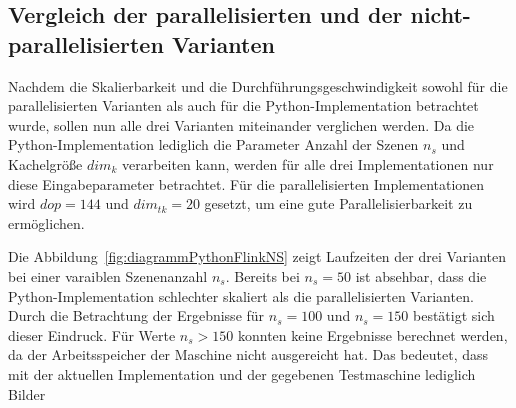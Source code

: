 \subsection{Vergleich der parallelisierten und der nicht-parallelisierten Varianten}
Nachdem die Skalierbarkeit und die Durchführungsgeschwindigkeit sowohl für die parallelisierten Varianten als auch für die Python-Implementation betrachtet wurde, sollen nun alle drei Varianten miteinander verglichen werden. Da die Python-Implementation lediglich die Parameter Anzahl der Szenen $n_s$ und Kachelgröße $dim_k$ verarbeiten kann, werden für alle drei Implementationen nur diese Eingabeparameter betrachtet. Für die parallelisierten Implementationen wird $dop=144$ und $dim_{tk} = 20$ gesetzt, um eine gute Parallelisierbarkeit zu ermöglichen.

Die Abbildung~\ref{fig:diagrammPythonFlinkNS} zeigt Laufzeiten der drei Varianten bei einer varaiblen Szenenanzahl $n_s$. Bereits bei $n_s = 50$ ist absehbar, dass die Python-Implementation schlechter skaliert als die parallelisierten Varianten. Durch die Betrachtung der Ergebnisse für $n_s=100$ und $n_s=150$ bestätigt sich dieser Eindruck. Für Werte $n_s > 150$ konnten keine Ergebnisse berechnet werden, da der Arbeitsspeicher der Maschine nicht ausgereicht hat. Das bedeutet, dass mit der aktuellen Implementation und der gegebenen Testmaschine lediglich Bilder 

